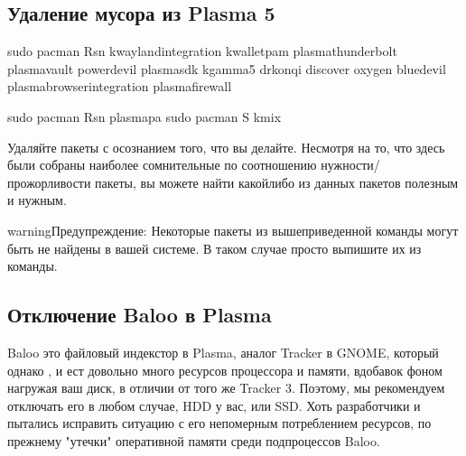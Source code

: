 \documentclass[letterpaper,10pt,russian,openany]{sphinxmanual}
\begin{document}
\subsection{Удаление мусора из Plasma 5}
\label{\detokenize{source/de-optimizations:plasma-5}}\label{\detokenize{source/de-optimizations:plasma-garbage-removal}}\label{\detokenize{source/de-optimizations:index-9}}
\begin{sphinxVerbatim}[commandchars=\\\{\}]
sudo pacman \PYGZhy{}Rsn kwayland\PYGZhy{}integration kwallet\PYGZhy{}pam plasma\PYGZhy{}thunderbolt plasma\PYGZhy{}vault powerdevil plasma\PYGZhy{}sdk kgamma5 drkonqi discover oxygen bluedevil plasma\PYGZhy{}browser\PYGZhy{}integration plasma\PYGZhy{}firewall

sudo pacman \PYGZhy{}Rsn plasma\PYGZhy{}pa     
sudo pacman \PYGZhy{}S kmix            
\end{sphinxVerbatim}

\sphinxAtStartPar
{} Удаляйте пакеты с осознанием того, что вы делайте.
Несмотря на то, что здесь были собраны наиболее сомнительные по соотношению нужности/прожорливости пакеты,
вы можете найти какой\sphinxhyphen{}либо из данных пакетов полезным и нужным.

\begin{sphinxadmonition}{warning}{Предупреждение:}
\sphinxAtStartPar
Некоторые пакеты из вышеприведенной команды могут быть не найдены в вашей системе.
В таком случае просто выпишите их из команды.
\end{sphinxadmonition}

\ignorespaces 

\subsection{Отключение Baloo в Plasma}
\label{\detokenize{source/de-optimizations:baloo-plasma}}\label{\detokenize{source/de-optimizations:disabling-baloo}}\label{\detokenize{source/de-optimizations:index-10}}
\sphinxAtStartPar
Baloo \sphinxhyphen{} это файловый индекстор в Plasma, аналог Tracker в GNOME, который однако
,
и ест довольно много ресурсов процессора и памяти, вдобавок фоном нагружая ваш диск, в отличии от того же Tracker 3.
Поэтому, мы рекомендуем отключать его в любом случае, HDD у вас, или SSD.
Хоть разработчики и пытались исправить ситуацию с его непомерным потреблением ресурсов,
по прежнему 
"утечки" оперативной памяти среди подпроцессов Baloo.
\end{document}
